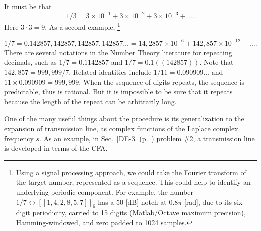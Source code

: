 \documentclass{ximera}
\begin{document}
It must be that
\[
1/3 = 3\times10^{-1} + 3\times10^{-2} + 3\times10^{-3} +\dots.
\]
Here $3\cdot3 = 9$.  As a second example,%
  \footnote{Using a signal processing approach, we could take the Fourier transform of the target number,
  represented as a sequence. This could help to identify an underlying periodic component. 
  For example, the number $1/7 \leftrightarrow [[1,4,2,8,5,7]]_6$ has a 50 [dB] notch at 0.8$\pi$ [rad], due to its
  six-digit periodicity, carried to 15 digits
 (Matlab/Octave maximum precision), Hamming-windowed, and zero padded to 1024 samples.
 	}


\[
1/7=0.142857,142857,142857,142857\dots = 14,2857\times10^{-6} +142,857\times10^{-12} + \dots.
\]
There are several notations in the Number Theory literature for repeating decimals, such as $1/7=0.1\overline{142857}$ and
$1/7=0.1((142857))$.
Note that $142,857=999,999/7$.  Related identities include $1/11=0.090909\dots$ and $11\times 0.090909=999,999$. 
When the sequence of digits repeats, the sequence is predictable, thus is rational.
But it is impossible to be sure that it repeats because the length of the repeat can be arbitrarily long.

 \comment
	{%
One of the many useful things about the procedure is its generalization to the expansion of
transmission line, as complex functions of the Laplace complex frequency $s$. As an example, in
   Sec.~\ref{DE-3} (p.~\pageref{DE-3}) problem \#2, %
a transmission line is developed in terms of the CFA.
	}


\end{document}
